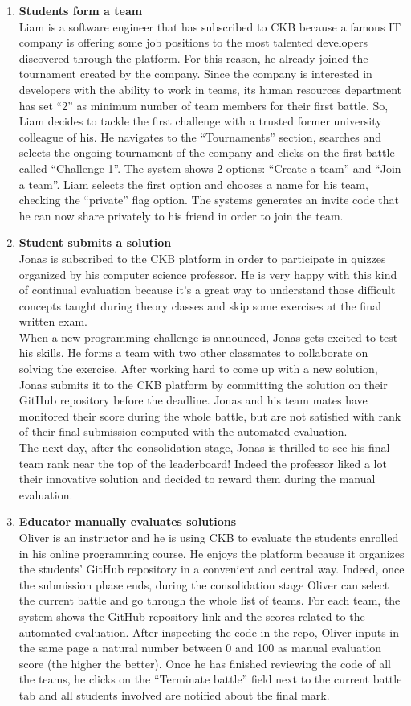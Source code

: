 \begin{enumerate}[label=\textbf{\arabic*}.]
    \item \textbf{ Students form a team}\\Liam is a software engineer that has subscribed to CKB because a famous IT company is offering some job positions to the most talented developers discovered through the platform. For this reason, he already joined the tournament created by the company. Since the company is interested in developers with the ability to work in teams, its human resources department has set “2” as minimum number of team members for their first battle. So, Liam decides to tackle the first challenge with a trusted former university colleague of his. He navigates to the “Tournaments” section, searches and selects the ongoing tournament of the company and clicks on the first battle called “Challenge 1”. The system shows 2 options: “Create a team” and “Join a team”. Liam selects the first option and chooses a name for his team, checking the “private” flag option. The systems generates an invite code that he can now share privately to his friend in order to join the team.
    \item \textbf{ Student submits a solution}\\Jonas is subscribed to the CKB platform in order to participate in quizzes organized by his computer science professor. He is very happy with this kind of continual evaluation because it's a great way to understand those difficult concepts taught during theory classes and skip some exercises at the final written exam.\\When a new programming challenge is announced, Jonas gets excited to test his skills. He forms a team with two other classmates to collaborate on solving the exercise. After working hard to come up with a new solution, Jonas submits it to the CKB platform by committing the solution on their GitHub repository before the deadline. Jonas and his team mates have monitored their score during the whole battle, but are not satisfied with rank of their final submission computed with the automated evaluation.\\The next day, after the consolidation stage, Jonas is thrilled to see his final team rank near the top of the leaderboard! Indeed the professor liked a lot their innovative solution and decided to  reward them during the manual evaluation.
    \item \textbf{ Educator manually evaluates solutions}\\Oliver is an instructor and he is using CKB to evaluate the students enrolled in his online programming course. He enjoys the platform because it organizes the students’ GitHub repository in a convenient and central way. Indeed, once the submission phase ends, during the consolidation stage Oliver can select the current battle and go through the whole list of teams. For each team, the system shows the GitHub repository link and the scores related to the automated evaluation. After inspecting the code in the repo, Oliver inputs in the same page a natural number between 0 and 100 as manual evaluation score (the higher the better). Once he has finished reviewing the code of all the teams, he clicks on the “Terminate battle” field next to the current battle tab and all students involved are notified about the final mark.

\end{enumerate}
